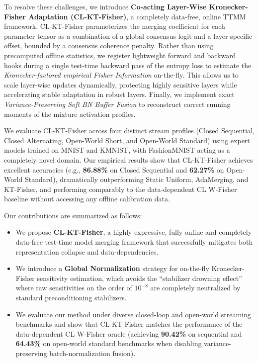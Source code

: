 \documentclass{article}
\theoremstyle{plain}
\theoremstyle{definition}
\theoremstyle{remark}
\begin{document}
To resolve these challenges, we introduce \textbf{Co-acting Layer-Wise Kronecker-Fisher Adaptation (CL-KT-Fisher)}, a completely data-free, online TTMM framework. CL-KT-Fisher parameterizes the merging coefficient for each parameter tensor as a combination of a global consensus logit and a layer-specific offset, bounded by a consensus coherence penalty. Rather than using precomputed offline statistics, we register lightweight forward and backward hooks during a single test-time backward pass of the entropy loss to estimate the \textit{Kronecker-factored empirical Fisher Information} on-the-fly. This allows us to scale layer-wise updates dynamically, protecting highly sensitive layers while accelerating stable adaptation in robust layers. Finally, we implement exact \textit{Variance-Preserving Soft BN Buffer Fusion} to reconstruct correct running moments of the mixture activation profiles.

We evaluate CL-KT-Fisher across four distinct stream profiles (Closed Sequential, Closed Alternating, Open-World Short, and Open-World Standard) using expert models trained on MNIST and KMNIST, with FashionMNIST acting as a completely novel domain. Our empirical results show that CL-KT-Fisher achieves excellent accuracies (e.g., \textbf{86.88\%} on Closed Sequential and \textbf{62.27\%} on Open-World Standard), dramatically outperforming Static Uniform, AdaMerging, and KT-Fisher, and performing comparably to the data-dependent CL W-Fisher baseline without accessing any offline calibration data.

Our contributions are summarized as follows:
\begin{itemize}
    \item We propose \textbf{CL-KT-Fisher}, a highly expressive, fully online and completely data-free test-time model merging framework that successfully mitigates both representation collapse and data-dependencies.
    \item We introduce a \textbf{Global Normalization} strategy for on-the-fly Kronecker-Fisher sensitivity estimation, which avoids the ``stabilizer drowning effect'' where raw sensitivities on the order of $10^{-8}$ are completely neutralized by standard preconditioning stabilizers.
    \item We evaluate our method under diverse closed-loop and open-world streaming benchmarks and show that CL-KT-Fisher matches the performance of the data-dependent CL W-Fisher oracle (achieving \textbf{90.42\%} on sequential and \textbf{64.43\%} on open-world standard benchmarks when disabling variance-preserving batch-normalization fusion).
\end{itemize}
\end{document}
